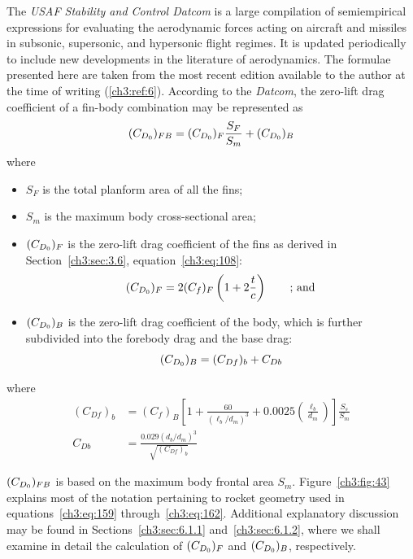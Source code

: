 The \emph{USAF Stability and Control Datcom} is a large compilation of
semiempirical expressions for evaluating the aerodynamic forces acting on
aircraft and missiles in subsonic, supersonic, and hypersonic flight regimes.
It is updated periodically to include new developments in the literature of
aerodynamics. The formulae presented here are taken from the most recent
edition available to the author at the time of writing (\ref{ch3:ref:6}).
According to the \emph{Datcom}, the zero-lift drag coefficient of a fin-body
combination may be represented as
\begin{equation}\label{ch3:eq:158}
(C_{D_0})_{FB} = (C_{D_0})_F\frac{S_F}{S_m} + (C_{D_0})_B
\end{equation}
where
\begin{itemize}[nosep,leftmargin=2.5em,label={}]
  \item $S_F$ is the total planform area of all the fins;
  \item $S_m$ is the maximum body cross-sectional area;
  \item $(C_{D_0})_F$ is the zero-lift drag coefficient of the fins as derived in
  Section~\ref{ch3:sec:3.6}, equation~\eqref{ch3:eq:108}:
  \begin{equation}\label{ch3:eq:159}
  (C_{D_0})_F = 2(C_f)_F\left(1 + 2\frac{t}{c}\right) \qquad \text{; and}
  \end{equation}
  \item $(C_{D_0})_B$ is the zero-lift drag coefficient of the body, which is
  further subdivided into the forebody drag and the base drag:
  \begin{equation}\label{ch3:eq:160}
  (C_{D_0})_B = (C_{Df})_b + C_{Db}
  \end{equation}
\end{itemize}
where
\begin{align}
(C_{Df})_b &= (C_f)_B\left[1 + \frac{60}{(\ell_b/d_m)^3}
  + 0.0025\left(\frac{\ell_b}{d_m}\right)\right]\frac{S_s}{S_m}
  \label{ch3:eq:161}\\
C_{Db} &= \frac{0.029(d_b/d_m)^3}{\sqrt{(C_{Df})_b}} \label{ch3:eq:162}
\end{align}

$(C_{D_0})_{FB}$ is based on the maximum body frontal area $S_m$.
Figure~\ref{ch3:fig:43} explains most of the notation pertaining to rocket
geometry used in equations~\eqref{ch3:eq:159} through~\eqref{ch3:eq:162}.
Additional explanatory discussion may be found in
Sections~\ref{ch3:sec:6.1.1} and~\ref{ch3:sec:6.1.2}, where we shall examine
in detail the calculation of $(C_{D_0})_F$ and $(C_{D_0})_B$, respectively.

